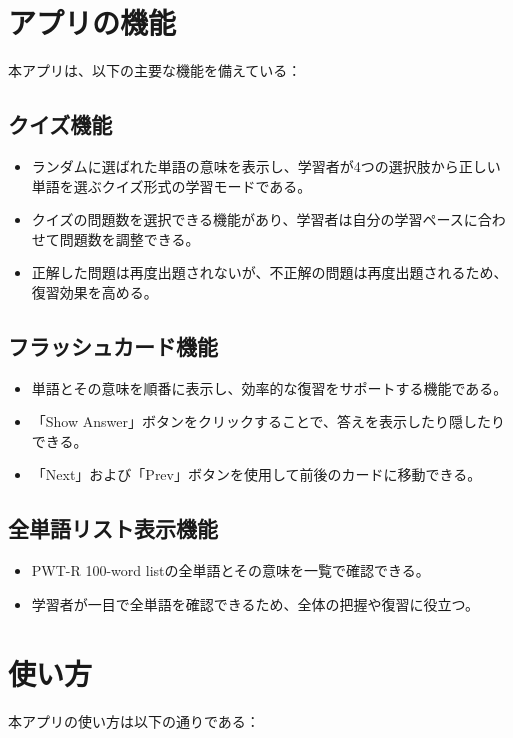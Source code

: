 \documentclass[]{jsarticle}
\begin{document}
\newpage
\section{アプリの機能}

本アプリは、以下の主要な機能を備えている：

\subsection{クイズ機能}
\begin{itemize}
    \item ランダムに選ばれた単語の意味を表示し、学習者が4つの選択肢から正しい単語を選ぶクイズ形式の学習モードである。
    \item クイズの問題数を選択できる機能があり、学習者は自分の学習ペースに合わせて問題数を調整できる。
    \item 正解した問題は再度出題されないが、不正解の問題は再度出題されるため、復習効果を高める。
\end{itemize}

\subsection{フラッシュカード機能}
\begin{itemize}
    \item 単語とその意味を順番に表示し、効率的な復習をサポートする機能である。
    \item 「Show Answer」ボタンをクリックすることで、答えを表示したり隠したりできる。
    \item 「Next」および「Prev」ボタンを使用して前後のカードに移動できる。
\end{itemize}

\subsection{全単語リスト表示機能}
\begin{itemize}
    \item PWT-R 100-word listの全単語とその意味を一覧で確認できる。
    \item 学習者が一目で全単語を確認できるため、全体の把握や復習に役立つ。
\end{itemize}

\newpage
\section{使い方}

本アプリの使い方は以下の通りである：
\end{document}
